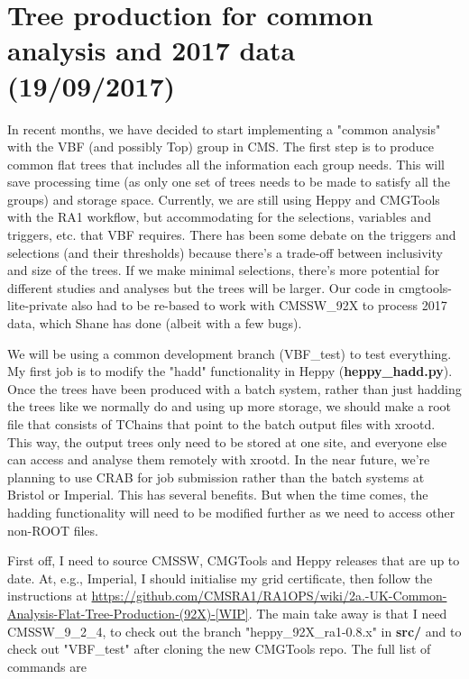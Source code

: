 \newpage
\section{Tree production for common analysis and 2017 data (19/09/2017)}

In recent months, we have decided to start implementing a "common analysis" with the VBF (and possibly Top) group in CMS. The first step is to produce common flat trees that includes all the information each group needs. This will save processing time (as only one set of trees needs to be made to satisfy all the groups) and storage space. Currently, we are still using Heppy and CMGTools with the RA1 workflow, but accommodating for the selections, variables and triggers, etc. that VBF requires. There has been some debate on the triggers and selections (and their thresholds) because there's a trade-off between inclusivity and size of the trees. If we make minimal selections, there's more potential for different studies and analyses but the trees will be larger. Our code in cmgtools-lite-private also had to be re-based to work with CMSSW\_92X to process 2017 data, which Shane has done (albeit with a few bugs).

We will be using a common development branch (VBF\_test) to test everything. My first job is to modify the "hadd" functionality in Heppy (\textbf{heppy\_hadd.py}). Once the trees have been produced with a batch system, rather than just hadding the trees like we normally do and using up more storage, we should make a root file that consists of TChains that point to the batch output files with xrootd. This way, the output trees only need to be stored at one site, and everyone else can access and analyse them remotely with xrootd. In the near future, we're planning to use CRAB for job submission rather than the batch systems at Bristol or Imperial. This has several benefits. But when the time comes, the hadding functionality will need to be modified further as we need to access other non-ROOT files.

First off, I need to source CMSSW, CMGTools and Heppy releases that are up to date. At, e.g., Imperial, I should initialise my grid certificate, then follow the instructions at \url{https://github.com/CMSRA1/RA1OPS/wiki/2a.-UK-Common-Analysis-Flat-Tree-Production-(92X)-[WIP]}. The main take away is that I need CMSSW\_9\_2\_4, to check out the branch "heppy\_92X\_ra1-0.8.x" in \textbf{src/} and to check out "VBF\_test" after cloning the new CMGTools repo. The full list of commands are

